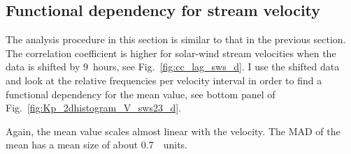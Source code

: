 \subsection{Functional dependency for stream velocity}
The analysis procedure in this section is similar to that in the previous section. The correlation coefficient is higher for solar-wind stream velocities when the data is shifted by 9~hours, see Fig.~\ref{fig:cc_lag_sws_d}.
I use the shifted data and look at the relative frequencies per velocity interval in order to find a functional dependency for the mean \Kp{} value, see bottom panel of Fig.~\ref{fig:Kp_2dhistogram_V_sws23_d}.
\begin{figure}
\end{figure}
Again, the mean \Kp{} value scales almost linear with the velocity. The MAD of the mean has a mean size of about \SI{0.7}{\Kp~units}.

